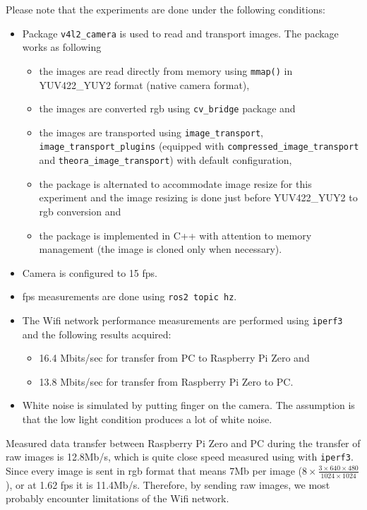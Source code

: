 Please note that the experiments are done under the following conditions:
\begin{itemize}
    \item Package \texttt{v4l2\_camera} is used to read and transport images. The package works as following \begin{itemize}
        \item the images are read directly from memory using \texttt{mmap()} in YUV422\_YUY2 format (native camera format),
        \item the images are converted \ac{rgb} using \texttt{cv\_bridge} package and
        \item the images are transported using \texttt{image\_transport}, \texttt{image\_transport\_plugins} (equipped with \texttt{compressed\_image\_transport} and \texttt{theora\_image\_transport}) with default configuration,
        \item the package is alternated to accommodate image resize for this experiment and the image resizing is done just before YUV422\_YUY2 to \ac{rgb} conversion and
        \item the package is implemented in C++ with attention to memory management (the image is cloned only when necessary).
    \end{itemize}
    \item Camera is configured to 15 \ac{fps}.
    \item \ac{fps} measurements are done using \texttt{ros2 topic hz}.
    \item The Wifi network performance measurements are performed using \texttt{iperf3} and the following results acquired: \begin{itemize}
        \item 16.4 Mbits/sec for transfer from PC to Raspberry Pi Zero and
        \item 13.8 Mbits/sec for transfer from Raspberry Pi Zero to PC.
    \end{itemize}
    \item White noise is simulated by putting finger on the camera. The assumption is that the low light condition produces a lot of white noise. 
\end{itemize}

Measured data transfer between Raspberry Pi Zero and PC during the transfer of raw images is 12.8Mb/s, which is quite close speed measured using with \texttt{iperf3}.
Since every image is sent in \ac{rgb} format that means 7Mb per image ($ 8 \times \frac{ 3 \times 640 \times 480 }{1024 \times 1024}$), or at 1.62 \ac{fps} it is 11.4Mb/s.
Therefore, by sending raw images, we most probably encounter limitations of the Wifi network.

